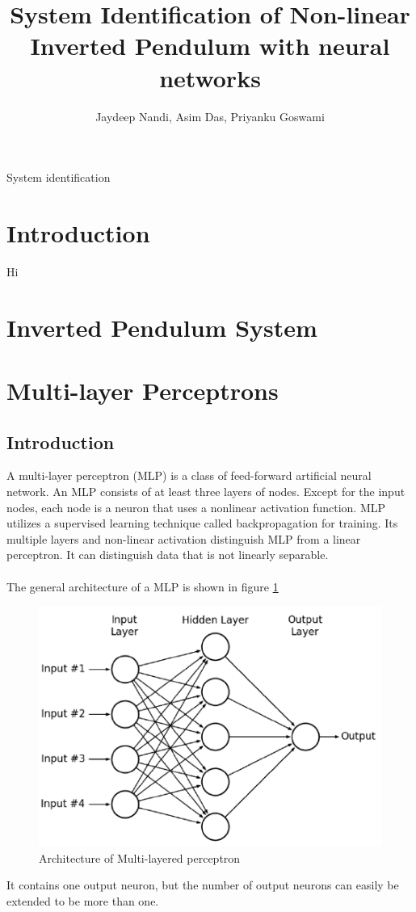 \documentclass[12pt, onecolumn]{extarticle}
\title{System Identification of Non-linear Inverted Pendulum with neural networks}
\author{Jaydeep Nandi, Asim Das, Priyanku Goswami}
\begin{document}
	\maketitle
	\abstract System identification
	
	\section{Introduction} Hi
	\section{Inverted Pendulum System}
	\section{Multi-layer Perceptrons} 
	
	\subsection{\textbf{Introduction}}
	A multi-layer perceptron (MLP) is a class of feed-forward artificial neural network. An MLP consists of at least three layers of nodes. Except for the input nodes, each node is a neuron that uses a nonlinear activation function. MLP utilizes a supervised learning technique called backpropagation for training. Its multiple layers and non-linear activation distinguish MLP from a linear perceptron. It can distinguish data that is not linearly separable. \\ \\  
	The general architecture of a MLP is shown in figure \ref{fig:MLP_1}   
	\begin{figure}[h]
		\centering
		\includegraphics[width=0.8\linewidth]{A-hypothetical-example-of-Multilayer-Perceptron-Network}
		\caption{Architecture of Multi-layered perceptron}
		\label{fig:MLP_1}
	\end{figure}  
 	It contains one output neuron, but the number of output neurons can easily be extended to be more than one. 
 	
\end{document}
